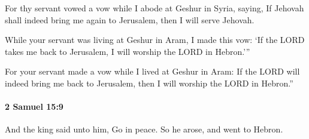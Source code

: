 			\begin{versebox}
					\item[BHS] 
					\item[ASV] For thy servant vowed a vow while I abode at Geshur in Syria, saying, If Jehovah shall indeed bring me again to Jerusalem, then I will serve Jehovah.
					\item[NIV] While your servant was living at Geshur in Aram, I made this vow: ‘If the LORD takes me back to Jerusalem, I will worship the LORD in Hebron.’”
					\item[NRSV] For your servant made a vow while I lived at Geshur in Aram: If the LORD will indeed bring me back to Jerusalem, then I will worship the LORD in Hebron.”
			\end{versebox}

		\paragraph{2 Samuel 15:9} %
			\label{2SAMUEL-15-9}

			And the king said unto him, Go in peace. So he arose, and went to Hebron.

